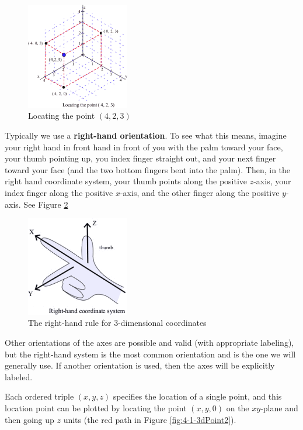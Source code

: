 \begin{figure}[!ht]
  \centering
    \includegraphics[width=0.4\textwidth]{img/chap4/image004.png}
    \caption{Locating the point $(4,2,3)$}
    \label{fig:4-1-Point423}
\end{figure}

Typically we use a {\bf right-hand orientation}. To see what this means, imagine your right hand in front hand in front of you with the palm toward your face, your thumb pointing up, you index finger straight out, and your next finger toward your face (and the two bottom fingers bent into the palm). Then, in the right hand coordinate system, your thumb points along the positive $z$-axis, your index finger along the positive $x$-axis, and the other finger along the positive $y$-axis. See Figure \ref{fig:4-1-hand}

\begin{figure}[!ht]
  \centering
    \includegraphics[width=0.4\textwidth]{img/chap4/image005.png}
    \caption{The right-hand rule for 3-dimensional coordinates}
    \label{fig:4-1-hand}
\end{figure}
Other orientations of the axes are possible and valid (with appropriate labeling), but the right-hand system is the most common orientation and is the one we will generally use. If another orientation is used, then the axes will be explicitly labeled.

Each ordered triple $(x,y,z)$ specifies the location of a single point, and this location point can be plotted by locating the point $(x,y,0)$ on the $xy$-plane and then going up $z$ units (the red path in Figure \ref{fig:4-1-3dPoint2}).

